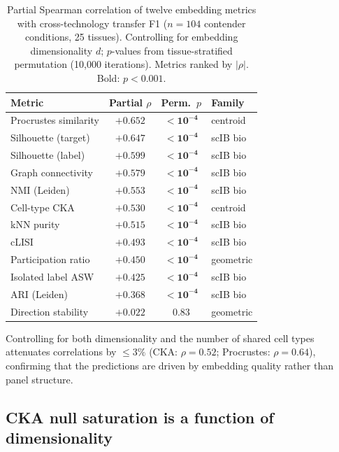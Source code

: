 \documentclass[11pt]{article}
\begin{document}
\medskip
\begin{table}[t]
\centering
\caption{Partial Spearman correlation of twelve embedding metrics with
cross-technology transfer F1 ($n = 104$ contender conditions, 25
tissues). Controlling for embedding dimensionality $d$; $p$-values from
tissue-stratified permutation (10,000 iterations). Metrics ranked by
$|\rho|$. Bold: $p < 0.001$.}
\label{tab:metrics}
\small
\begin{tabular}{@{}lccl@{}}
\toprule
Metric & Partial $\rho$ & Perm.\ $p$ & Family \\
\midrule
Procrustes similarity   & $+0.652$ & $\mathbf{< 10^{-4}}$ & centroid \\
Silhouette (target)     & $+0.647$ & $\mathbf{< 10^{-4}}$ & scIB bio \\
Silhouette (label)      & $+0.599$ & $\mathbf{< 10^{-4}}$ & scIB bio \\
Graph connectivity      & $+0.579$ & $\mathbf{< 10^{-4}}$ & scIB bio \\
NMI (Leiden)            & $+0.553$ & $\mathbf{< 10^{-4}}$ & scIB bio \\
Cell-type CKA           & $+0.530$ & $\mathbf{< 10^{-4}}$ & centroid \\
kNN purity              & $+0.515$ & $\mathbf{< 10^{-4}}$ & scIB bio \\
cLISI                   & $+0.493$ & $\mathbf{< 10^{-4}}$ & scIB bio \\
Participation ratio     & $+0.450$ & $\mathbf{< 10^{-4}}$ & geometric \\
Isolated label ASW      & $+0.425$ & $\mathbf{< 10^{-4}}$ & scIB bio \\
ARI (Leiden)            & $+0.368$ & $\mathbf{< 10^{-4}}$ & scIB bio \\
Direction stability     & $+0.022$ & $0.83$               & geometric \\
\bottomrule
\end{tabular}
\end{table}

Controlling for both dimensionality and the number of shared cell types
attenuates correlations by $\leq 3\%$ (CKA: $\rho = 0.52$; Procrustes:
$\rho = 0.64$), confirming that the predictions are driven by embedding
quality rather than panel structure.


\subsection{CKA null saturation is a function of dimensionality}
\label{sec:nullfloor}
\end{document}
